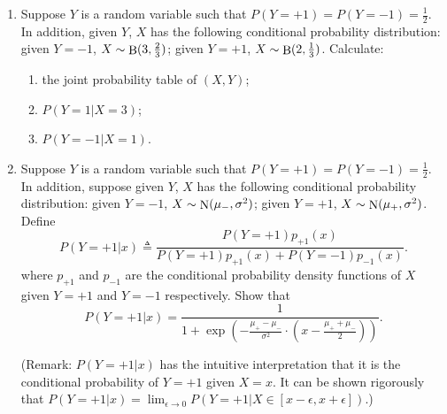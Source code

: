 \documentclass{article}
\DeclareMathOperator*{\Bin}{{\rm B}}
\DeclareMathOperator*{\N}{{\rm N}}
\newcommand{\defeq}{\triangleq}
\begin{document}
\begin{enumerate}
\item Suppose $Y$ is a random variable such that $P(Y=+1) = P(Y=-1) = \frac12$.
In addition, given $Y$, $X$ has the following conditional probability distribution:
given $Y = -1$, $X \sim \Bin(3, \frac 2 3)$; given $Y = +1$,
$X \sim \Bin(2, \frac 1 3)$. Calculate:
\begin{enumerate}
  \item the joint probability table of $(X,Y)$;
  \item $P(Y=1 | X = 3)$;
  \item $P(Y=-1|X=1)$.
\end{enumerate}

\item Suppose $Y$ is a random variable such that $P(Y=+1) = P(Y=-1) = \frac12$.
In addition, suppose given $Y$, $X$ has the following conditional probability
distribution: given $Y = -1$, $X \sim \N(\mu_-, \sigma^2)$; given $Y = +1$,
$X \sim \N(\mu_+, \sigma^2)$. Define
\[ P(Y=+1|x) \defeq \frac{P(Y=+1) p_{+1}(x)}{P(Y=+1) p_{+1}(x) + P(Y=-1) p_{-1}(x)}. \]
where $p_{+1}$ and $p_{-1}$
are the conditional probability density functions of $X$ given $Y = +1$ and
$Y = -1$ respectively.
Show that
\[ P(Y=+1|x) = \frac{1}{1+\exp(-\frac{\mu_+ - \mu_-}{\sigma^2} \cdot (x - \frac{\mu_++\mu_-}{2}) )}. \]

(Remark: $P(Y=+1|x)$ has the intuitive interpretation that it is
 the conditional probability of $Y=+1$ given $X = x$. It can be shown rigorously
 that $P(Y=+1|x) = \lim_{\epsilon \to 0} P(Y=+1|X \in [x-\epsilon, x+\epsilon])$.)
\end{enumerate}
\end{document}
